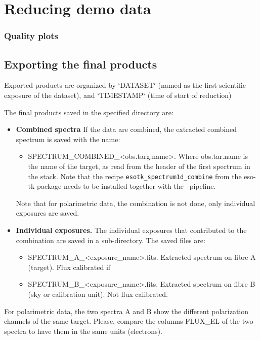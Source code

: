 
\section{Reducing demo data}
\label{sec:reducing_demo_data}



 
\subsubsection{Quality plots}


\subsection{Exporting the final products}
\label{sec:export_final_products}




Exported products are organized by `DATASET` (named as the first
scientific exposure of the dataset), and `TIMESTAMP` (time of start of
reduction)

The final products saved in the specified directory are: 


\begin{itemize}
\item {\bf Combined spectra} If the data are combined, the extracted combined spectrum is saved with the name:
\begin{itemize}
\item SPECTRUM\_COMBINED\_<obs.targ.name>. Where obs.tar.name is the name of the target, as read from the header of the first spectrum in the stack. Note that the recipe {\tt esotk\_spectrum1d\_combine} from the eso-tk package needs to be installed together with the \pipename\ pipeline.
\end{itemize}
Note that for polarimetric data, the combination is not done, only individual exposures are saved.

\item {\bf Individual exposures.}
The individual exposures that contributed to the combination are saved in a sub-directory. The saved files are:
\begin{itemize}
\item SPECTRUM\_A\_<exposure\_name>.fits. Extracted spectrum on fibre A (target). Flux calibrated if 
\item SPECTRUM\_B\_<exposure\_name>.fits. Extracted spectrum on fibre B (sky or calibration unit). Not flux calibrated.
\end{itemize}
\end{itemize}
For polarimetric data, the two spectra A and B show the different polarization channels of the same target. Please, compare the columns FLUX\_EL of the two spectra to have them in the same units (electrons).


